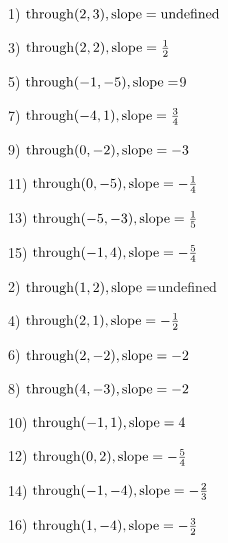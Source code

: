 {}

\begin{multicols}{2}
  1) $\operatorname{through} (2, 3), \operatorname{slope} = \operatorname{undefined}$
  
  3) $\operatorname{through} (2, 2), \operatorname{slope} = \frac{1}{2}$
  
  5) $\operatorname{through} (- 1, - 5), \operatorname{slope} =$9
  
  7) $\operatorname{through} (- 4, 1), \operatorname{slope} = \frac{3}{4}$
  
  9) $\operatorname{through} (0, - 2), \operatorname{slope} = - 3$
  
  11) $\operatorname{through} (0, - 5), \operatorname{slope} = - \frac{1}{4}$
  
  13) $\operatorname{through} (- 5, - 3), \operatorname{slope} = \frac{1}{5}$
  
  15) $\operatorname{through} (- 1, 4), \operatorname{slope} = - \frac{5}{4}$
  
  2) $\operatorname{through} (1, 2), \operatorname{slope} =$undefined
  
  4) $\operatorname{through} (2, 1), \operatorname{slope} = - \frac{1}{2}$
  
  6) $\operatorname{through} (2, - 2), \operatorname{slope} = - 2$
  
  8) $\operatorname{through} (4, - 3), \operatorname{slope} = - 2$
  
  10) $\operatorname{through} (- 1, 1), \operatorname{slope} = 4$
  
  12) $\operatorname{through} (0, 2), \operatorname{slope} = - \frac{5}{4}$
  
  14) $\operatorname{through} (- 1, - 4), \operatorname{slope} = - \frac{2}{3}$
  
  16) $\operatorname{through} (1, - 4), \operatorname{slope} = - \frac{3}{2}$
\end{multicols}

\

{}

